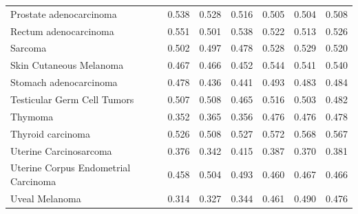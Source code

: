 \begin{tabularx}{\textwidth}{@{}Yrrrrrr@{}}
Prostate adenocarcinoma & 0.538 & 0.528 & 0.516 & 0.505 & 0.504 & 0.508 \\
Rectum adenocarcinoma & 0.551 & 0.501 & 0.538 & 0.522 & 0.513 & 0.526 \\
Sarcoma & 0.502 & 0.497 & 0.478 & 0.528 & 0.529 & 0.520 \\
Skin Cutaneous Melanoma & 0.467 & 0.466 & 0.452 & 0.544 & 0.541 & 0.540 \\
Stomach adenocarcinoma & 0.478 & 0.436 & 0.441 & 0.493 & 0.483 & 0.484 \\
Testicular Germ Cell Tumors & 0.507 & 0.508 & 0.465 & 0.516 & 0.503 & 0.482 \\
Thymoma & 0.352 & 0.365 & 0.356 & 0.476 & 0.476 & 0.478 \\
Thyroid carcinoma & 0.526 & 0.508 & 0.527 & 0.572 & 0.568 & 0.567 \\
Uterine Carcinosarcoma & 0.376 & 0.342 & 0.415 & 0.387 & 0.370 & 0.381 \\
Uterine Corpus Endometrial Carcinoma & 0.458 & 0.504 & 0.493 & 0.460 & 0.467 & 0.466 \\
Uveal Melanoma & 0.314 & 0.327 & 0.344 & 0.461 & 0.490 & 0.476 \\
\bottomrule
\end{tabularx}
